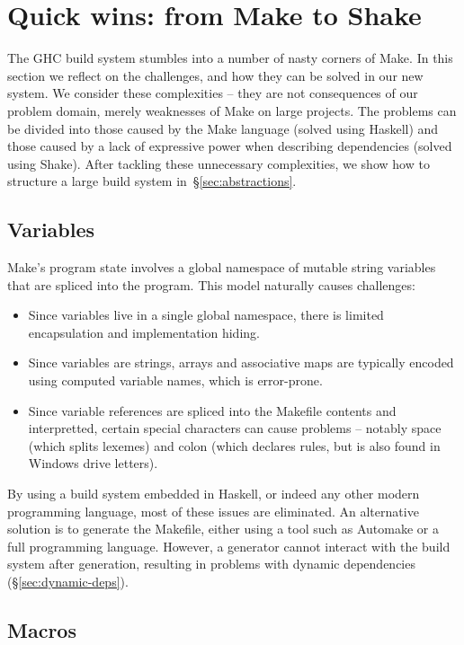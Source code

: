 \section{Quick wins: from Make to Shake\label{sec:solutions}}

The GHC build system stumbles into a number of nasty corners of Make. In this
section we reflect on the challenges, and how they can be solved in
our new system. We consider these  complexities --
they are not consequences of our problem domain, merely weaknesses of Make on
large projects. The problems can be divided into those caused by the
Make language (solved using Haskell) and those caused by a lack of expressive
power when describing dependencies (solved using Shake).
After tackling these unnecessary complexities, we show how to structure a
large build system in~\S\ref{sec:abstractions}.

\subsection{Variables}

Make's program state involves a global namespace of mutable string variables that are
spliced into the program. This model naturally causes challenges:

\begin{itemize}
\item Since variables live in a single global namespace, there is limited
encapsulation and implementation hiding.
\item Since variables are strings, arrays and associative maps are typically
encoded using computed variable names, which is error-prone.
\item Since variable references are spliced into the Makefile contents
and interpretted, certain special characters can cause problems --
notably space (which splits lexemes) and colon (which declares rules, but is
also found in Windows drive letters).
\end{itemize}

By using a build system embedded in Haskell, or indeed any other modern programming language,
most of these issues are eliminated. An alternative solution is to generate the Makefile, either using a tool such as Automake or a full programming language. However, a generator cannot interact with the
build system after generation, resulting in problems with dynamic dependencies
(\S\ref{sec:dynamic-deps}).

\subsection{Macros\label{sec:pattern-rule-language}}

